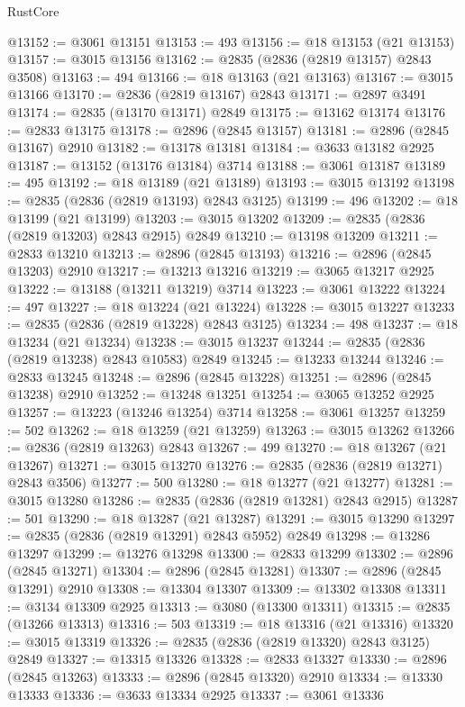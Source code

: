 \begin{lexlean}{RustCore}
\begin{coremodule}
@13152 := @3061 @13151
@13153 := 493
@13156 := @18 @13153 (@21 @13153)
@13157 := @3015 @13156
@13162 := @2835 (@2836 (@2819 @13157) @2843 @3508)
@13163 := 494
@13166 := @18 @13163 (@21 @13163)
@13167 := @3015 @13166
@13170 := @2836 (@2819 @13167) @2843
@13171 := @2897 @3491
@13174 := @2835 (@13170 @13171) @2849
@13175 := @13162 @13174
@13176 := @2833 @13175
@13178 := @2896 (@2845 @13157)
@13181 := @2896 (@2845 @13167) @2910
@13182 := @13178 @13181
@13184 := @3633 @13182 @2925
@13187 := @13152 (@13176 @13184) @3714
@13188 := @3061 @13187
@13189 := 495
@13192 := @18 @13189 (@21 @13189)
@13193 := @3015 @13192
@13198 := @2835 (@2836 (@2819 @13193) @2843 @3125)
@13199 := 496
@13202 := @18 @13199 (@21 @13199)
@13203 := @3015 @13202
@13209 := @2835 (@2836 (@2819 @13203) @2843 @2915) @2849
@13210 := @13198 @13209
@13211 := @2833 @13210
@13213 := @2896 (@2845 @13193)
@13216 := @2896 (@2845 @13203) @2910
@13217 := @13213 @13216
@13219 := @3065 @13217 @2925
@13222 := @13188 (@13211 @13219) @3714
@13223 := @3061 @13222
@13224 := 497
@13227 := @18 @13224 (@21 @13224)
@13228 := @3015 @13227
@13233 := @2835 (@2836 (@2819 @13228) @2843 @3125)
@13234 := 498
@13237 := @18 @13234 (@21 @13234)
@13238 := @3015 @13237
@13244 := @2835 (@2836 (@2819 @13238) @2843 @10583) @2849
@13245 := @13233 @13244
@13246 := @2833 @13245
@13248 := @2896 (@2845 @13228)
@13251 := @2896 (@2845 @13238) @2910
@13252 := @13248 @13251
@13254 := @3065 @13252 @2925
@13257 := @13223 (@13246 @13254) @3714
@13258 := @3061 @13257
@13259 := 502
@13262 := @18 @13259 (@21 @13259)
@13263 := @3015 @13262
@13266 := @2836 (@2819 @13263) @2843
@13267 := 499
@13270 := @18 @13267 (@21 @13267)
@13271 := @3015 @13270
@13276 := @2835 (@2836 (@2819 @13271) @2843 @3506)
@13277 := 500
@13280 := @18 @13277 (@21 @13277)
@13281 := @3015 @13280
@13286 := @2835 (@2836 (@2819 @13281) @2843 @2915)
@13287 := 501
@13290 := @18 @13287 (@21 @13287)
@13291 := @3015 @13290
@13297 := @2835 (@2836 (@2819 @13291) @2843 @5952) @2849
@13298 := @13286 @13297
@13299 := @13276 @13298
@13300 := @2833 @13299
@13302 := @2896 (@2845 @13271)
@13304 := @2896 (@2845 @13281)
@13307 := @2896 (@2845 @13291) @2910
@13308 := @13304 @13307
@13309 := @13302 @13308
@13311 := @3134 @13309 @2925
@13313 := @3080 (@13300 @13311)
@13315 := @2835 (@13266 @13313)
@13316 := 503
@13319 := @18 @13316 (@21 @13316)
@13320 := @3015 @13319
@13326 := @2835 (@2836 (@2819 @13320) @2843 @3125) @2849
@13327 := @13315 @13326
@13328 := @2833 @13327
@13330 := @2896 (@2845 @13263)
@13333 := @2896 (@2845 @13320) @2910
@13334 := @13330 @13333
@13336 := @3633 @13334 @2925
@13337 := @3061 @13336

\end{coremodule}
\end{lexlean}
